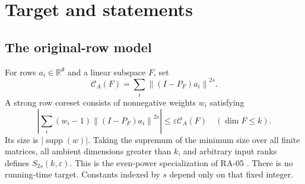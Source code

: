 \documentclass[11pt]{article}
\theoremstyle{remark}\newtheorem{remark}[theorem]{Remark}
\newcommand{\R}{\mathbb R}\newcommand{\E}{\mathbb E}\newcommand{\Prob}{\mathbb P}
\newcommand{\eps}{\varepsilon}\newcommand{\Sym}{\operatorname{Sym}}
\newcommand{\supp}{\operatorname{supp}}\newcommand{\op}{\mathrm{op}}\newcommand{\HS}{\mathrm{HS}}
\newcommand{\norm}[1]{\left\|#1\right\|}\newcommand{\ip}[2]{\left\langle #1,#2\right\rangle}
\newcommand{\cost}{\mathcal C}\newcommand{\OPT}{\mathsf{OPT}}
\begin{document}
{\small\setlength{\parskip}{0pt}\tableofcontents}\newpage

\section{Target and statements}
\subsection{The original-row model}
For rows $a_i\in\R^{\mathsf d}$ and a linear subspace $F$, set
\[
 \cost_A(F)=\sum_i\norm{(I-P_F)a_i}^{2s}.
\]
A strong row coreset consists of nonnegative weights $w_i$ satisfying
\begin{equation}\label{eq:strong}
 \left|\sum_i(w_i-1)\norm{(I-P_F)a_i}^{2s}\right|
 \le\eps\cost_A(F)\quad(\dim F\le k).
\end{equation}
Its size is $|\supp(w)|$. Taking the supremum of the minimum size over all finite matrices, all ambient dimensions greater than $k$, and arbitrary input ranks defines $S_{2s}(k,\eps)$. This is the even-power specialization of RA-05 \cite{ra05}. There is no running-time target. Constants indexed by $s$ depend only on that fixed integer.
\end{document}
